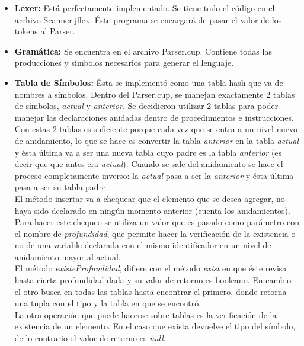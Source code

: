 \documentclass[11pt, spanish]{report}
\begin{document}
\begin{itemize}
\item \textbf{Lexer:}
  Est\'a perfectamente implementado. Se tiene todo el c\'odigo en el archivo Scanner.jflex. \'Este programa se encargar\'a de pasar el valor de los tokens al Parser.
\item \textbf{Gram\'atica:}
  Se encuentra en el archivo Parser.cup. Contiene todas las producciones y s\'imbolos necesarios para generar el lenguaje.
\item \textbf{Tabla de S\'imbolos:}
  \'Esta se implement\'o como una tabla hash que va de nombres a s\'imbolos. Dentro del Parser.cup, se manejan exactamente 2 tablas de s\'imbolos, \emph{actual} y \emph{anterior}. 
  Se decidieron utilizar 2 tablas para poder manejar las declaraciones anidadas dentro de procedimientos e instrucciones. Con estas 2 tablas es suficiente porque cada vez que se 
  entra a un nivel nuevo de anidamiento, lo que se hace es  convertir la tabla \emph{anterior} en la tabla \emph{actual} y \'esta \'ultima va a ser una nueva tabla cuyo padre es la tabla \emph{anterior} (es decir que que antes era \emph{actual}). Cuando se sale del anidamiento se hace el proceso completamente inverso: la \emph{actual} pasa a ser la \emph{anterior} y \'esta \'ultima pasa a ser su tabla padre.\\

  El m\'etodo insertar va a chequear que el elemento que se desea agregar, no haya sido declarado en ning\'un momento anterior (cuenta los anidamientos). Para hacer este chequeo se
  utiliza un valor que es pasado como par\'ametro con el nombre de \emph{profundidad}, que permite hacer la verificaci\'on de la existencia o no de una variable declarada con el 
  mismo identificador en un nivel de anidamiento mayor al actual.\\

  El m\'etodo \emph{existeProfundidad}, difiere con el m\'etodo \emph{exist} en que \'este revisa hasta cierta profundidad dada y su valor de retorno es booleano. En cambio el otro busca en todas las tablas hasta encontrar el primero, donde retorna una tupla con el tipo y la tabla en que se encontr\'o.\\

  La otra operaci\'on que puede hacerse sobre tablas es la verificaci\'on de la existencia de un elemento. En el caso que exista devuelve el tipo del s\'imbolo, de lo contrario 
  el valor de retorno es \emph{null}.\\


\end{itemize}
\end{document}
